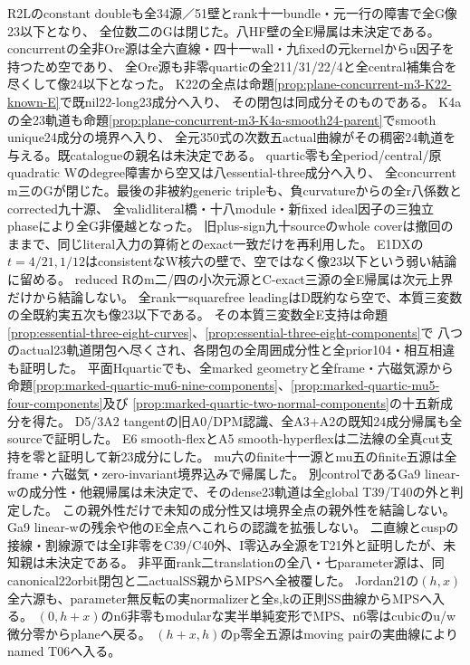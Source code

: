 \documentclass[a4paper,11pt]{ltjsarticle}
\theoremstyle{definition}
\begin{document}
R2Lのconstant doubleも全34源／51壁とrank十一bundle・元一行の障害で全G像23以下となり、
全位数二のGは閉じた。八HF壁の全E帰属は未決定である。
concurrentの全非Ore源は全六直線・四十一wall・九fixedの元kernelからu因子を持つため空であり、
全Ore源も非零quarticの全211/31/22/4と全central補集合を尽くして像24以下となった。
K22の全点は命題\ref{prop:plane-concurrent-m3-K22-known-E}で既nil22-long23成分へ入り、
その閉包は同成分そのものである。
K4aの全23軌道も命題\ref{prop:plane-concurrent-m3-K4a-smooth24-parent}でsmooth unique24成分の境界へ入り、
全元350式の次数五actual曲線がその稠密24軌道を与える。既catalogueの親名は未決定である。
quartic零も全period/central/原quadratic Wのdegree障害から空又は八essential-three成分へ入り、
全concurrent m三のGが閉じた。最後の非被約generic tripleも、負curvatureからの全r八係数とcorrected九十源、
全validliteral橋・十八module・新fixed ideal因子の三独立phaseにより全G非優越となった。
旧plus-sign九十sourceのwhole coverは撤回のままで、同じliteral入力の算術とのexact一致だけを再利用した。
E1DXの$t=4/21,1/12$はconsistentなW核六の壁で、空ではなく像23以下という弱い結論に留める。
reduced Rのm二/四の小次元源とC-exact三源の全E帰属は次元上界だけから結論しない。
全rank一squarefree leadingはD既約なら空で、本質三変数の全既約実五次も像23以下である。
その本質三変数全E支持は命題\ref{prop:essential-three-eight-curves}、\ref{prop:essential-three-eight-components}で
八つのactual23軌道閉包へ尽くされ、各閉包の全周囲成分性と全prior104・相互相違も証明した。
平面Hquarticでも、全marked geometryと全frame・六磁気源から
命題\ref{prop:marked-quartic-mu6-nine-components}、\ref{prop:marked-quartic-mu5-four-components}及び
\ref{prop:marked-quartic-two-normal-components}の十五新成分を得た。
D5/3A2 tangentの旧A0/DPM認識、全A3+A2の既知24成分帰属も全sourceで証明した。
E6 smooth-flexとA5 smooth-hyperflexは二法線の全真cut支持を零と証明して新23成分にした。
mu六のfinite十一源とmu五のfinite五源は全frame・六磁気・zero-invariant境界込みで帰属した。
別controlであるGa9 linear-wの成分性・他親帰属は未決定で、そのdense23軌道は全global T39/T40の外と判定した。
この親外性だけで未知の成分性又は境界全点の親外性を結論しない。
Ga9 linear-wの残余や他のE全点へこれらの認識を拡張しない。
二直線とcuspの接線・割線源では全I非零をC39/C40外、I零込み全源をT21外と証明したが、未知親は未決定である。
非平面rank二translationの全八・七parameter源は、同canonical22orbit閉包と二actualSS親からMPSへ全被覆した。
Jordan21の$(h,x)$全六源も、parameter無反転の実normalizerと全s,kの正則SS曲線からMPSへ入る。
$(0,h+x)$のn6非零もmodularな実半単純変形でMPS、n6零はcubicのu/w微分零からplaneへ戻る。
$(h+x,h)$のp零全五源はmoving pairの実曲線によりnamed T06へ入る。
\end{document}
